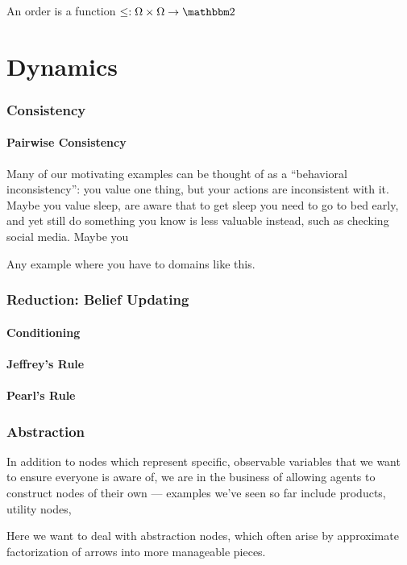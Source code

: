 \documentclass{article}
\begin{document}
	
	An order is a function $\leq: \Omega \times \Omega \to \mathbbm 2$
	
	\part{Dynamics}
	
	\section{Consistency}
	\subsection{Pairwise Consistency}
	Many of our motivating examples can be thought of as a ``behavioral inconsistency'': you value one thing, but your actions are inconsistent with it. Maybe you value sleep, are aware that to get sleep you need to go to bed early, and yet still do something you know is less valuable instead, such as checking social media. Maybe you 

	Any example where you have to domains like this.
	
	\section{Reduction: Belief Updating}
	\subsection{Conditioning}
	\subsection{Jeffrey's Rule}
	\subsection{Pearl's Rule}
	
	\section{Abstraction}
	In addition to nodes which represent specific, observable variables that we want to ensure everyone is aware of, we are in the business of allowing agents to construct nodes of their own --- examples we've seen so far include products, utility nodes, 
	
	Here we want to deal with abstraction nodes, which often arise by approximate factorization of arrows into more manageable pieces.
	
\end{document}
